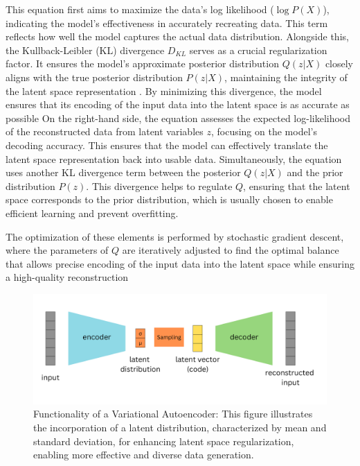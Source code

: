 This equation first aims to maximize the data's log likelihood (\(\log P(X)\)), indicating the model's effectiveness in accurately recreating data. This term reflects how well the model captures the actual data distribution. Alongside this, the Kullback-Leibler (KL) divergence \(D_{KL}\) serves as a crucial regularization factor. It ensures the model's approximate posterior distribution \(Q(z|X)\) closely aligns with the true posterior distribution \(P(z|X)\), maintaining the integrity of the latent space representation \citep{doerschVAE}. By minimizing this divergence, the model ensures that its encoding of the input data into the latent space is as accurate as possible On the right-hand side, the equation assesses the expected log-likelihood of the reconstructed data from latent variables \(z\), focusing on the model’s decoding accuracy. This ensures that the model can effectively translate the latent space representation back into usable data. Simultaneously, the equation uses another KL divergence term between the posterior \(Q(z|X)\) and the prior distribution \(P(z)\). This divergence helps to regulate \(Q\), ensuring that the latent space corresponds to the prior distribution, which is usually chosen to enable efficient learning and prevent overfitting. 

The optimization of these elements is performed by stochastic gradient descent, where the parameters of \(Q\) are iteratively adjusted to find the optimal balance that allows precise encoding of the input data into the latent space while ensuring a high-quality reconstruction \citep{doerschVAE}


\begin{figure}[ht]
    \centering
      \hspace{.8cm}
      \includegraphics[width=.9\columnwidth]{figures/VAE.png}
      \caption{Functionality of a Variational Autoencoder: This figure illustrates the incorporation of a latent distribution, characterized by mean and standard deviation, for enhancing latent space regularization, enabling more effective and diverse data generation.}\label{fig:figureVAE}
\end{figure}

